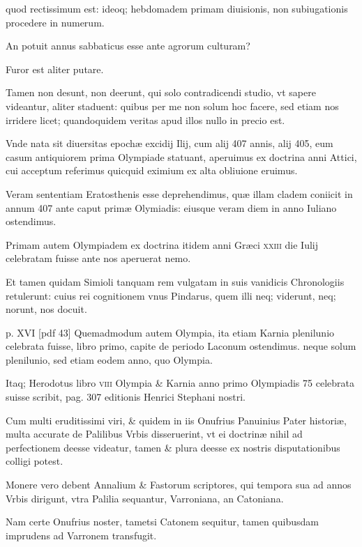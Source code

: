 \begin{parnumbers}
quod rectissimum est: ideoq; hebdomadem
primam diuisionis, non subiugationis procedere in numerum.

An
potuit annus sabbaticus esse ante agrorum culturam?

Furor est aliter putare.

Tamen non desunt, non deerunt, qui solo contradicendi
studio, vt sapere videantur, aliter staduent: quibus per me non solum
hoc facere, sed etiam nos irridere licet; quandoquidem veritas apud
illos nullo in precio est.

Vnde nata sit diuersitas epochæ excidij Ilij,
cum alij 407 annis, alij 405, eum casum antiquiorem prima Olympiade
statuant, aperuimus ex doctrina anni Attici, cui acceptum
referimus quicquid eximium ex alta obliuione eruimus.

Veram sententiam
Eratosthenis esse deprehendimus, quæ illam cladem coniicit
in annum 407 ante caput primæ Olymiadis: eiusque veram
diem in anno Iuliano ostendimus.

Primam autem Olympiadem
ex doctrina itidem anni Græci \textsc{xxiii} die Iulij celebratam fuisse ante
nos aperuerat nemo.

Et tamen quidam Simioli tanquam rem
vulgatam in suis vanidicis Chronologiis retulerunt: cuius rei cognitionem
vnus Pindarus, quem illi neq; viderunt, neq; norunt, nos
docuit.


\clearpage
p. XVI [pdf 43]
Quemadmodum autem Olympia, ita etiam Karnia plenilunio
celebrata fuisse, libro primo, capite de periodo Laconum
ostendimus. neque solum plenilunio, sed etiam eodem anno, quo
Olympia.

Itaq; Herodotus libro \textsc{viii} Olympia \& Karnia anno primo
Olympiadis 75 celebrata suisse scribit, pag. 307 editionis Henrici
Stephani nostri.

Cum multi eruditissimi viri, \& quidem in iis
Onufrius Panuinius Pater historiæ, multa accurate de Palilibus Vrbis
disseruerint, vt ei doctrinæ nihil ad perfectionem deesse videatur,
tamen \& plura deesse ex nostris disputationibus colligi potest.

Monere vero debent Annalium \& Fastorum scriptores, qui tempora
sua ad annos Vrbis dirigunt, vtra Palilia sequantur, Varroniana,
an Catoniana.

Nam certe Onufrius noster, tametsi Catonem sequitur,
tamen quibusdam imprudens ad Varronem transfugit.


\end{parnumbers}
